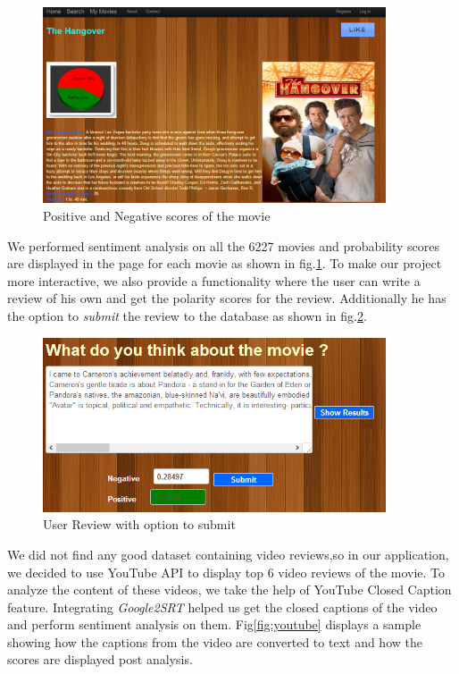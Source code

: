\begin{figure}[H]
    \centering
    \includegraphics[width=4.0in]{score.png}
    \caption{Positive and Negative scores of the movie}
    \label{fig:score}
\end{figure}
We performed sentiment analysis on all the 6227 movies and probability scores are displayed in the page for each movie as shown in fig.\ref{fig:score}. To make our project more interactive, we also provide a functionality where the user can write a review of his own and get the polarity scores for the review. Additionally he has the option to \textit{submit} the review to the database as shown in fig.\ref{fig:review}.

\begin{figure}[H]
    \centering
    \includegraphics[width=4.0in]{review.png}
    \caption{User Review with option to submit}
    \label{fig:review}
    \end{figure}

We did not find any good dataset containing video reviews,so in our application, we decided to use YouTube API\cite{youtube2} to display top 6 video reviews of the movie. To analyze the content of these videos, we take the help of YouTube Closed Caption feature. Integrating \textit{Google2SRT} \cite{youtube} helped us get the closed captions of the video and perform sentiment analysis on them. Fig\ref{fig:youtube} displays a sample showing how the captions from the video are converted to text and how the scores are displayed post analysis.


